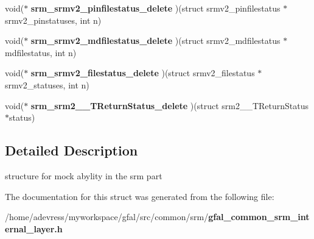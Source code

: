 \begin{CompactItemize}
\item 
void($\ast$ \textbf{srm\_\-srmv2\_\-pinfilestatus\_\-delete} )(struct srmv2\_\-pinfilestatus $\ast$srmv2\_\-pinstatuses, int n)\label{struct__gfal__srm__external__call_755de3bb11627d248e340aec4f6db49b}

\item 
void($\ast$ \textbf{srm\_\-srmv2\_\-mdfilestatus\_\-delete} )(struct srmv2\_\-mdfilestatus $\ast$mdfilestatus, int n)\label{struct__gfal__srm__external__call_8334ed4e5c1835eeb209c02d68f39939}

\item 
void($\ast$ \textbf{srm\_\-srmv2\_\-filestatus\_\-delete} )(struct srmv2\_\-filestatus $\ast$srmv2\_\-statuses, int n)\label{struct__gfal__srm__external__call_a3bd168b26c0c5b613f2ebd66d903fb2}

\item 
void($\ast$ \textbf{srm\_\-srm2\_\-\_\-TReturn\-Status\_\-delete} )(struct srm2\_\-\_\-TReturn\-Status $\ast$status)\label{struct__gfal__srm__external__call_d3600d77afae102a47cc323f60da5d3d}

\end{CompactItemize}


\subsection{Detailed Description}
structure for mock abylity in the srm part 



The documentation for this struct was generated from the following file:\begin{CompactItemize}
\item 
/home/adevress/myworkspace/gfal/src/common/srm/\bf{gfal\_\-common\_\-srm\_\-internal\_\-layer.h}\end{CompactItemize}
